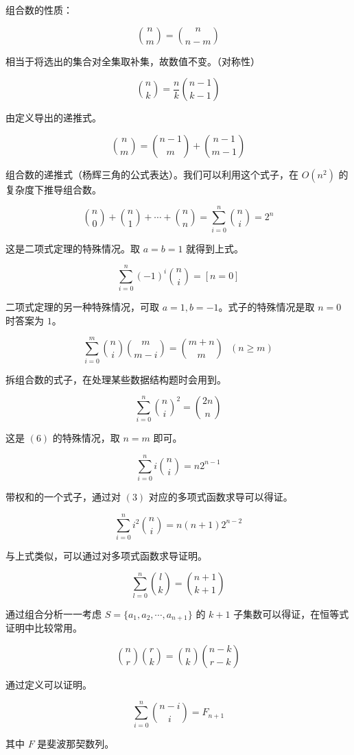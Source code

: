 组合数的性质：

\[
\binom{n}{m}=\binom{n}{n-m}\tag{1}
\]

相当于将选出的集合对全集取补集，故数值不变。（对称性）

\[
\binom{n}{k} = \frac{n}{k} \binom{n-1}{k-1}\tag{2}
\]

由定义导出的递推式。

\[
\binom{n}{m}=\binom{n-1}{m}+\binom{n-1}{m-1}\tag{3}
\]

组合数的递推式（杨辉三角的公式表达）。我们可以利用这个式子，在 $O(n^2)$ 的复杂度下推导组合数。

\[
\binom{n}{0}+\binom{n}{1}+\cdots+\binom{n}{n}=\sum_{i=0}^n\binom{n}{i}=2^n\tag{4}
\]

这是二项式定理的特殊情况。取 $a=b=1$ 就得到上式。

\[
\sum_{i=0}^n(-1)^i\binom{n}{i}=[n=0]\tag{5}
\]

二项式定理的另一种特殊情况，可取 $a=1, b=-1$。式子的特殊情况是取 $n=0$ 时答案为 $1$。

\[
\sum_{i=0}^m \binom{n}{i}\binom{m}{m-i} = \binom{m+n}{m}\ \ \ (n \geq m)\tag{6}
\]

拆组合数的式子，在处理某些数据结构题时会用到。

\[
\sum_{i=0}^n\binom{n}{i}^2=\binom{2n}{n}\tag{7}
\]

这是 $(6)$ 的特殊情况，取 $n=m$ 即可。

\[
\sum_{i=0}^ni\binom{n}{i}=n2^{n-1}\tag{8}
\]

带权和的一个式子，通过对 $(3)$ 对应的多项式函数求导可以得证。

\[
\sum_{i=0}^ni^2\binom{n}{i}=n(n+1)2^{n-2}\tag{9}
\]

与上式类似，可以通过对多项式函数求导证明。

\[
\sum_{l=0}^n\binom{l}{k} = \binom{n+1}{k+1}\tag{10}
\]

通过组合分析一一考虑 $S=\{a_1, a_2, \cdots, a_{n+1}\}$ 的 $k+1$ 子集数可以得证，在恒等式证明中比较常用。

\[
\binom{n}{r}\binom{r}{k} = \binom{n}{k}\binom{n-k}{r-k}\tag{11}
\]

通过定义可以证明。

\[
\sum_{i=0}^n\binom{n-i}{i}=F_{n+1}\tag{12}
\]

其中 $F$ 是斐波那契数列。
